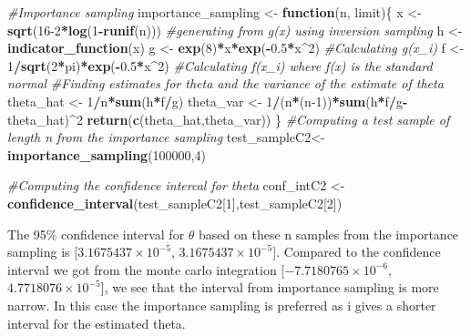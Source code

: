 \documentclass[
]{article}
\newenvironment{Shaded}{\begin{snugshade}}{\end{snugshade}}
\newcommand{\CommentTok}[1]{\textcolor[rgb]{0.56,0.35,0.01}{\textit{#1}}}
\newcommand{\ControlFlowTok}[1]{\textcolor[rgb]{0.13,0.29,0.53}{\textbf{#1}}}
\newcommand{\DecValTok}[1]{\textcolor[rgb]{0.00,0.00,0.81}{#1}}
\newcommand{\FloatTok}[1]{\textcolor[rgb]{0.00,0.00,0.81}{#1}}
\newcommand{\KeywordTok}[1]{\textcolor[rgb]{0.13,0.29,0.53}{\textbf{#1}}}
\newcommand{\NormalTok}[1]{#1}
\newcommand{\OperatorTok}[1]{\textcolor[rgb]{0.81,0.36,0.00}{\textbf{#1}}}
\newcommand{\StringTok}[1]{\textcolor[rgb]{0.31,0.60,0.02}{#1}}
\begin{document}
\begin{Shaded}
\begin{Highlighting}[]
\CommentTok{#Importance sampling}
\NormalTok{importance_sampling <-}\StringTok{ }\ControlFlowTok{function}\NormalTok{(n, limit)\{}
\NormalTok{  x <-}\StringTok{ }\KeywordTok{sqrt}\NormalTok{(}\DecValTok{16-2}\OperatorTok{*}\KeywordTok{log}\NormalTok{(}\DecValTok{1}\OperatorTok{-}\KeywordTok{runif}\NormalTok{(n))) }\CommentTok{#generating from g(x) using inversion sampling}
\NormalTok{  h <-}\StringTok{ }\KeywordTok{indicator_function}\NormalTok{(x) }
\NormalTok{  g <-}\StringTok{ }\KeywordTok{exp}\NormalTok{(}\DecValTok{8}\NormalTok{)}\OperatorTok{*}\NormalTok{x}\OperatorTok{*}\KeywordTok{exp}\NormalTok{(}\OperatorTok{-}\FloatTok{0.5}\OperatorTok{*}\NormalTok{x}\OperatorTok{^}\DecValTok{2}\NormalTok{) }\CommentTok{#Calculating g(x_i)}
\NormalTok{  f <-}\StringTok{ }\DecValTok{1}\OperatorTok{/}\KeywordTok{sqrt}\NormalTok{(}\DecValTok{2}\OperatorTok{*}\NormalTok{pi)}\OperatorTok{*}\KeywordTok{exp}\NormalTok{(}\OperatorTok{-}\FloatTok{0.5}\OperatorTok{*}\NormalTok{x}\OperatorTok{^}\DecValTok{2}\NormalTok{) }\CommentTok{#Calculating f(x_i) where f(x) is the standard normal}
  \CommentTok{#Finding estimates for theta and the variance of the estimate of theta}
\NormalTok{  theta_hat <-}\StringTok{ }\DecValTok{1}\OperatorTok{/}\NormalTok{n}\OperatorTok{*}\KeywordTok{sum}\NormalTok{(h}\OperatorTok{*}\NormalTok{f}\OperatorTok{/}\NormalTok{g)}
\NormalTok{  theta_var <-}\StringTok{ }\DecValTok{1}\OperatorTok{/}\NormalTok{(n}\OperatorTok{*}\NormalTok{(n}\DecValTok{-1}\NormalTok{))}\OperatorTok{*}\KeywordTok{sum}\NormalTok{(h}\OperatorTok{*}\NormalTok{f}\OperatorTok{/}\NormalTok{g}\OperatorTok{-}\NormalTok{theta_hat)}\OperatorTok{^}\DecValTok{2}
  \KeywordTok{return}\NormalTok{(}\KeywordTok{c}\NormalTok{(theta_hat,theta_var))}
\NormalTok{\}}
\CommentTok{#Computing a test sample of length n from the importance sampling}
\NormalTok{test_sampleC2<-}\KeywordTok{importance_sampling}\NormalTok{(}\DecValTok{100000}\NormalTok{,}\DecValTok{4}\NormalTok{)}

\CommentTok{#Computing the confidence intercal for theta}
\NormalTok{conf_intC2 <-}\StringTok{ }\KeywordTok{confidence_interval}\NormalTok{(test_sampleC2[}\DecValTok{1}\NormalTok{],test_sampleC2[}\DecValTok{2}\NormalTok{])}
\end{Highlighting}
\end{Shaded}

The 95\% confidence interval for \(\theta\) based on these n samples
from the importance sampling is {[}\ensuremath{3.1675437\times 10^{-5}},
\ensuremath{3.1675437\times 10^{-5}}{]}. Compared to the confidence
interval we got from the monte carlo integration
{[}\ensuremath{-7.7180765\times 10^{-6}},
\ensuremath{4.7718076\times 10^{-5}}{]}, we see that the interval from
importance sampling is more narrow. In this case the importance sampling
is preferred as i gives a shorter interval for the estimated theta.
\end{document}
